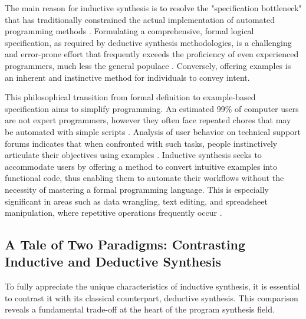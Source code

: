 \documentclass[12pt, a4paper]{report}
\begin{document}
The main reason for inductive synthesis is to resolve the "specification bottleneck" that has traditionally constrained the actual implementation of automated programming methods \citep{gulwani2017program}.  Formulating a comprehensive, formal logical specification, as required by deductive synthesis methodologies, is a challenging and error-prone effort that frequently exceeds the proficiency of even experienced programmers, much less the general populace \citep{gulwani2012dimensions}.  Conversely, offering examples is an inherent and instinctive method for individuals to convey intent.

This philosophical transition from formal definition to example-based specification aims to simplify programming.  An estimated 99\% of computer users are not expert programmers, however they often face repeated chores that may be automated with simple scripts \citep{gulwani2011automating}.  Analysis of user behavior on technical support forums indicates that when confronted with such tasks, people instinctively articulate their objectives using examples \citep{gulwani2012dimensions}.  Inductive synthesis seeks to accommodate users by offering a method to convert intuitive examples into functional code, thus enabling them to automate their workflows without the necessity of mastering a formal programming language.  This is especially significant in areas such as data wrangling, text editing, and spreadsheet manipulation, where repetitive operations frequently occur \citep{gulwani2017program}.

\subsection{A Tale of Two Paradigms: Contrasting Inductive and Deductive Synthesis}

To fully appreciate the unique characteristics of inductive synthesis, it is essential to contrast it with its classical counterpart, deductive synthesis. This comparison reveals a fundamental trade-off at the heart of the program synthesis field.
\end{document}
